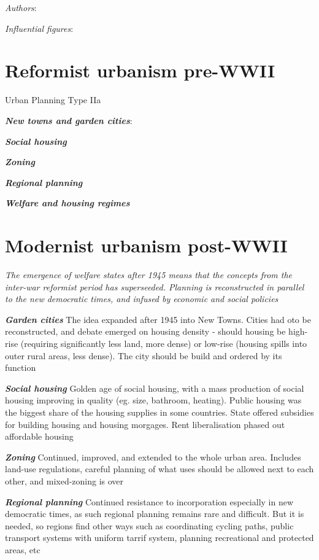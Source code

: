 \documentclass{article}
\newcommand{\bisection}[1]{\textbf{\textit{#1}}}
\newcommand{\alignedmarginpar}[1]{%
        \marginpar{\raggedright\small #1}
    }
\begin{document}
\textit{Authors}:

\textit{Influential figures}:

\bisection{}

\pagebreak
\section{Reformist urbanism pre-WWII}
Urban Planning Type IIa 

\bisection{New towns and garden cities}:\alignedmarginpar{Lechtsworth, 1903}

\bisection{Social housing}

\bisection{Zoning}

\bisection{Regional planning}

\bisection{Welfare and housing regimes}


\pagebreak
\section{Modernist urbanism post-WWII}

\textit{The emergence of welfare states after 1945 means that the concepts from the inter-war reformist period has superseeded. Planning is reconstructed in parallel to the new democratic times, and infused by economic and social policies}

\bisection{Garden cities} The idea expanded after 1945 into New Towns. Cities had oto be reconstructed, and debate emerged on housing density - should housing be high-rise (requiring significantly less land, more dense) or low-rise (housing spills into outer rural areas, less dense). The city should be build and ordered by its function

\bisection{Social housing} Golden age of social housing, with a mass production of social housing improving in quality (eg. size, bathroom, heating). Public housing was the biggest share of the housing supplies in some countries. State offered subsidies for building housing and housing morgages. Rent liberalisation phased out affordable housing

\bisection{Zoning} Continued, improved, and extended to the whole urban area. Includes land-use regulations, careful planning of what uses should be allowed next to each other, and mixed-zoning is over

\bisection{Regional planning} Continued resistance to incorporation especially in new democratic times, as such regional planning remains rare and difficult. But it is needed, so regions find other ways such as coordinating cycling paths, public transport systems with uniform tarrif system, planning recreational and protected areas, etc
\end{document}
